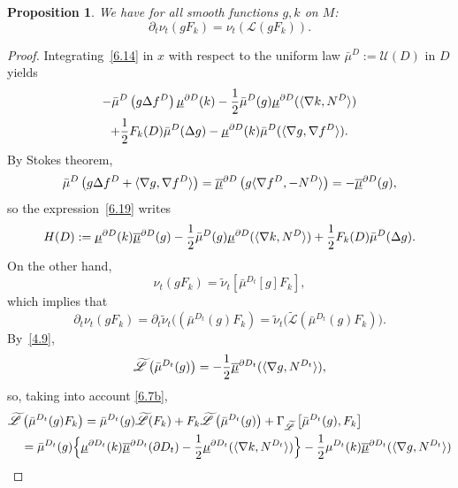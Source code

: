 \documentclass[JEP,XML,SOM,Unicode,NoFloatCountersInSection,published]{cedram}
\theoremstyle{plain}
\newtheorem{prop}[thm]{Proposition}
\theoremstyle{definition}
\newcommand{\SL}{{\mathscr L}}
\newcommand{\SU}{{\mathscr U}}
\newcommand{\usm}{{\underline{\smash{\mu}}}}
\newcommand{\usbm}{{\underline{\smash{\overline\mu}}}}
\let\f\frac
\let\D\Delta
\let\n\nabla
\let\wi\widetilde
\begin{document}
\begin{prop}
\label{P6.2}
We have for all smooth functions $g,k$ on $M$:
\begin{equation}
\label{6.15.1}
\partial_t\nu_t(gF_k)=\nu_t(\SL (gF_k)).
\end{equation}
\end{prop}
\begin{proof}
Integrating~\eqref{6.14} in $x$ with respect to the uniform law $\bar\mu^D:=\SU(D)$ in $D$ yields
\begin{multline}
\label{6.19}
-\bar\mu^D\left(g\D f^D\right)\usm^{\partial D}(k)-\f12 \bar\mu^D(g)\usm^{\partial D}(\langle \n k,N^D\rangle)\\
+\f12 F_k(D)\bar\mu^D(\D g)-\usm^{\partial D}(k)\bar\mu^D(\langle \n g,\n f^D\rangle ).
\end{multline}
By Stokes theorem,
\begin{equation}
\bar\mu^D\left(g\D f^D+\langle \n g,\n f^D\rangle\right)=\usbm^{\partial D}\left(g\langle \n f^D, -N^D\rangle \right)=-\usbm^{\partial D}(g),
\end{equation}
so the expression~\eqref{6.19} writes
\begin{equation}
H(D):=\usm^{\partial D}(k)\usbm^{\partial D}(g)-\f12\bar\mu^D(g)\usm^{\partial D}(\langle \n k,N^D\rangle )+\f12F_k(D)\bar \mu^D(\D g).
\end{equation}
On the other hand,
\begin{equation}
\nu_t(gF_k)=\wi\nu_t[\bar \mu^{D_t}[g] F_k],
\end{equation}
which implies that
\begin{equation}
\label{6.23}
\partial_t\nu_t(gF_k)=\partial_t\wi\nu_t(\left(\bar \mu^{D_t}(g) F_k\right)=\wi\nu_t\bigl(\wi\SL\left(\bar \mu^{D_t}(g) F_k\right)\bigr).
\end{equation}
By~\eqref{4.9},
\begin{equation}
\wi\SL\left(\bar \mu^{D_t}(g)\right)=-\f12\usbm^{\partial D_t}(\langle \n g,N^{D_t}\rangle),
\end{equation}
so, taking into account \eqref{6.7b},
\begin{align*}
\wi\SL&\left(\bar \mu^{D_t}(g)F_k\right)=\bar \mu^{D_t}(g)\wi \SL(F_k)+F_k\wi\SL\left(\bar \mu^{D_t}(g)\right)+\Gamma_{\wi\SL}\left[\bar \mu^{D_t}(g), F_k\right]\\
&=\bar\mu^{D_t}(g)\Big\{\usm^{\partial D_t}(k)\usbm^{\partial D_t}(\partial D_t)-\f12 \usm^{\partial D_t}(\langle \n k, N^{D_t}\rangle)\Big\}-\f12 \mu^{D_t}(k)\usbm^{\partial D_t}(\langle \n g,N^{D_t}\rangle )\\

\end{align*}
\end{proof}
\end{document}
